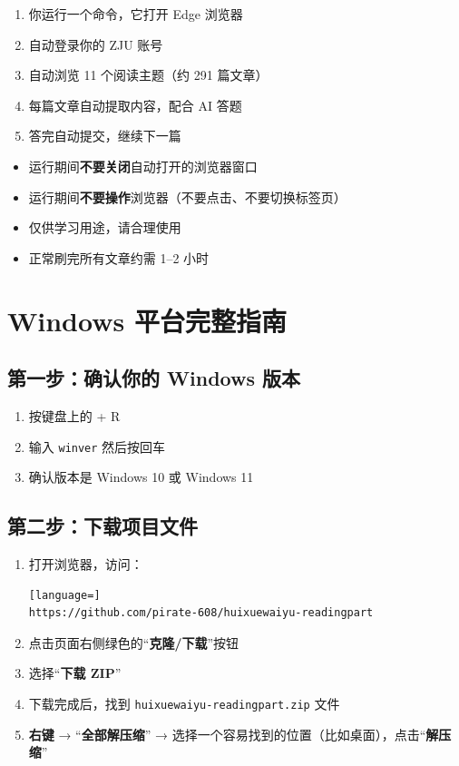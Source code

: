 \documentclass[12pt,a4paper]{ctexart}
\newcommand{\winR}{\faWindows{} + R}
\begin{document}
\begin{enumerate}[nosep]
  \item 你运行一个命令，它打开 Edge 浏览器
  \item 自动登录你的 ZJU 账号
  \item 自动浏览 11 个阅读主题（约 291 篇文章）
  \item 每篇文章自动提取内容，配合 AI 答题
  \item 答完自动提交，继续下一篇
\end{enumerate}

\bigskip

\begin{warnbox}
  \begin{itemize}[nosep]
    \item 运行期间\textbf{不要关闭}自动打开的浏览器窗口
    \item 运行期间\textbf{不要操作}浏览器（不要点击、不要切换标签页）
    \item 仅供学习用途，请合理使用
    \item 正常刷完所有文章约需 1--2 小时
  \end{itemize}
\end{warnbox}

\newpage
\section{Windows 平台完整指南}

\subsection{第一步：确认你的 Windows 版本}

\begin{enumerate}[nosep]
  \item 按键盘上的 \winR
  \item 输入 \texttt{winver} 然后按回车
  \item 确认版本是 Windows 10 或 Windows 11
\end{enumerate}

\subsection{第二步：下载项目文件}

\begin{enumerate}
  \item 打开浏览器，访问：
    \begin{lstlisting}[language=]
https://github.com/pirate-608/huixuewaiyu-readingpart
\end{lstlisting}
  \item 点击页面右侧绿色的``\textbf{克隆/下载}''按钮
  \item 选择``\textbf{下载 ZIP}''
  \item 下载完成后，找到 \texttt{huixuewaiyu-readingpart.zip} 文件
  \item \textbf{右键} → ``\textbf{全部解压缩}'' →
    选择一个容易找到的位置（比如桌面），点击``\textbf{解压缩}''
\end{enumerate}
\end{document}
